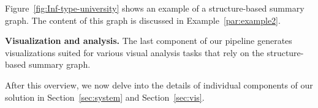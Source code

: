 Figure~\ref{fig:Inf-type-university} shows an example of a structure-based summary graph. %
The content of this graph is discussed in Example~\ref{par:example2}.





\noindent \textbf{Visualization and analysis.} %
The last component of our pipeline generates visualizations suited for various visual analysis tasks that rely on the structure-based summary graph. 



\smallskip
After this overview, we now delve into the details of individual components of our solution in Section~\ref{sec:system} and Section~\ref{sec:vis}.


